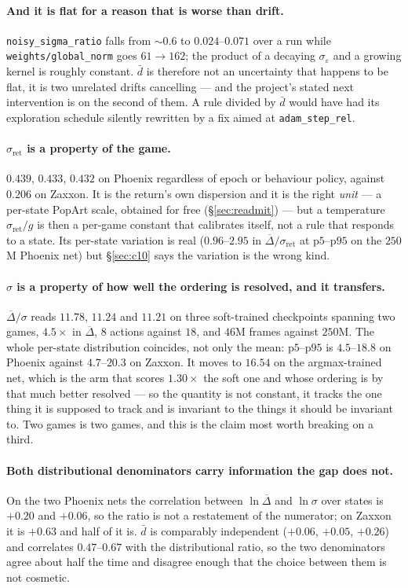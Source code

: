\documentclass{article}
\newcommand{\gapbar}{\overline{\Delta}}
\newcommand{\dbar}{\bar{d}}
\newcommand{\sret}{\sigma_{\mathrm{ret}}}
\newcommand{\srank}{\sigma}
\newcommand{\snoise}{\sigma_{\varepsilon}}
\begin{document}
\paragraph{And it is flat for a reason that is worse than drift.} \texttt{noisy\_sigma\_ratio}
falls from ${\sim}0.6$ to $0.024$--$0.071$ over a run while \texttt{weights/global\_norm} goes
$61 \to 162$; the product of a decaying $\snoise$ and a growing kernel is roughly constant.
$\dbar$ is therefore not an uncertainty that happens to be flat, it is two unrelated drifts
cancelling --- and the project's stated next intervention is on the second of them. A rule
divided by $\dbar$ would have had its exploration schedule silently rewritten by a fix aimed at
\texttt{adam\_step\_rel}.

\paragraph{$\sret$ is a property of the game.} $0.439$, $0.433$, $0.432$ on Phoenix regardless of
epoch or behaviour policy, against $0.206$ on Zaxxon. It is the return's own dispersion and it is
the right \emph{unit} --- a per-state PopArt scale, obtained for free (\S\ref{sec:readmit}) ---
but a temperature $\sret/g$ is then a per-game constant that calibrates itself, not a rule that
responds to a state. Its per-state variation is real ($0.96$--$2.95$ in $\gapbar/\sret$ at
$\text{p}5$--$\text{p}95$ on the $250$M Phoenix net) but \S\ref{sec:c10} says the variation is the wrong kind.

\paragraph{$\srank$ is a property of how well the ordering is resolved, and it transfers.}
$\gapbar/\srank$ reads $11.78$, $11.24$ and $11.21$ on three soft-trained checkpoints spanning
two games, $4.5\times$ in $\gapbar$, $8$ actions against $18$, and $46$M frames against $250$M.
The whole per-state distribution coincides, not only the mean: $\text{p}5$--$\text{p}95$ is
$4.5$--$18.8$ on Phoenix against $4.7$--$20.3$ on Zaxxon. It moves to $16.54$ on the
argmax-trained net, which is the arm that scores $1.30\times$ the soft one and whose ordering is
by that much better resolved --- so the quantity is not constant, it tracks the one thing it is
supposed to track and is invariant to the things it should be invariant to. Two games is two
games, and this is the claim most worth breaking on a third.

\paragraph{Both distributional denominators carry information the gap does not.} On the two
Phoenix nets the correlation between $\ln\gapbar$ and $\ln\srank$ over states is $+0.20$ and
$+0.06$, so the ratio is not a restatement of the numerator; on Zaxxon it is $+0.63$ and half of
it is. $\dbar$ is comparably independent ($+0.06$, $+0.05$, $+0.26$) and correlates
$0.47$--$0.67$ with the distributional ratio, so the two denominators agree about half the time and disagree
enough that the choice between them is not cosmetic.
\end{document}
